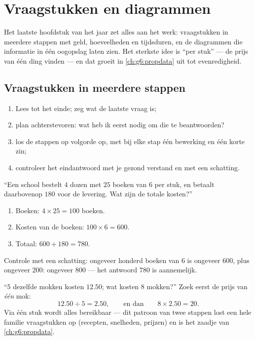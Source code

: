 \chapter{Vraagstukken en diagrammen}\label{ch:g5:data}

Het laatste hoofdstuk van het jaar zet alles aan het werk: vraagstukken in
meerdere stappen met geld, hoeveelheden en tijdsduren, en de diagrammen die
informatie in één oogopslag laten zien. Het sterkste idee is ``per stuk'' ---
de prijs van één ding vinden --- en dat groeit in \cref{ch:g6:propdata} uit
tot evenredigheid.

\section{Vraagstukken in meerdere stappen}

\begin{method}\label{met:g5:data:steps}
\begin{enumerate}
  \item Lees tot het einde; zeg wat de laatste vraag is;
  \item plan achterstevoren: wat heb ik eerst nodig om die te
        beantwoorden?
  \item los de stappen op volgorde op, met bij elke stap één bewerking en
        één korte zin;
  \item controleer het eindantwoord met je gezond verstand en met een
        schatting.
\end{enumerate}
\end{method}

\begin{example}\label{ex:g5:data:multistep}
``Een school bestelt $4$ dozen met $25$ boeken van $6$ per stuk, en betaalt
daarbovenop $180$ voor de levering. Wat zijn de totale kosten?''
\begin{enumerate}
  \item Boeken: $4 \times 25 = 100$ boeken.
  \item Kosten van de boeken: $100 \times 6 = 600$.
  \item Totaal: $600 + 180 = 780$.
\end{enumerate}
Controle met een schatting: ongeveer honderd boeken van $6$ is ongeveer
$600$, plus ongeveer $200$: ongeveer $800$ --- het antwoord $780$ is
aannemelijk.
\end{example}

\begin{example}\label{ex:g5:data:perone}
``$5$ dezelfde mokken kosten $12.50$; wat kosten $8$ mokken?'' Zoek eerst de
prijs van \emph{één} mok:
\[
12.50 \div 5 = 2.50,
\qquad\text{en dan}\qquad
8 \times 2.50 = 20 .
\]
Via één stuk wordt alles bereikbaar --- dit patroon van twee stappen lost een
hele familie vraagstukken op (recepten, snelheden, prijzen) en is het zaadje
van \cref{ch:g6:propdata}.
\end{example}

